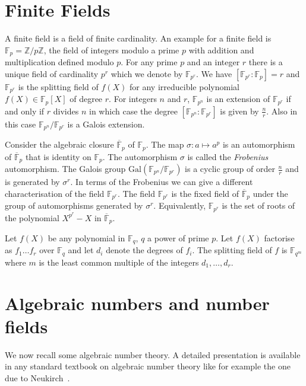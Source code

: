 \documentclass[11pt]{madras}%
\theoremstyle{remark}
\newcommand{\Gal}[1]{{\ensuremath{\mathrm{Gal}\left(#1\right)}}}
\begin{document}
\section{Finite Fields}\label{sect-finite-fields}

A finite field is a field of finite cardinality. An example for a
finite field is $\mathbb{F}_p = \mathbb{Z}/p\mathbb{Z}$, the field of
integers modulo a prime $p$ with addition and multiplication defined
modulo $p$.  For any prime $p$ and an integer $r$ there is a unique
field of cardinality $p^r$ which we denote by $\mathbb{F}_{p^r}$. We
have $[\mathbb{F}_{p^r} : \mathbb{F}_p] = r$ and $\mathbb{F}_{p^r}$ is
the splitting field of $f(X)$ for any irreducible polynomial $f(X) \in
\mathbb{F}_p[X]$ of degree $r$. For integers $n$ and $r$,
$\mathbb{F}_{p^n}$ is an extension of $\mathbb{F}_{p^r}$ if and only
if $r$ divides $n$ in which case the degree
$[\mathbb{F}_{p^n}:\mathbb{F}_{p^r}]$ is given by $\frac{n}{r}$. Also
in this case $\mathbb{F}_{p^n}/\mathbb{F}_{p^r}$ is a Galois
extension.

Consider the algebraic closure $\overline{\mathbb{F}}_p$ of
$\mathbb{F}_p$. The map $\sigma: a \mapsto a^p$ is an automorphism of
$\overline{\mathbb{F}}_p$ that is identity on $\mathbb{F}_p$. The
automorphism $\sigma$ is called the \emph{Frobenius}
automorphism. The Galois group
$\Gal{\mathbb{F}_{p^n}/\mathbb{F}_{p^r}}$ is a cyclic group of order
$\frac{n}{r}$ and is generated by $\sigma^r$.  In terms of the
Frobenius we can give a different characterisation of the field
$\mathbb{F}_{p^r}$. The field $\mathbb{F}_{p^r}$ is the fixed field of
$\overline{\mathbb{F}}_p$ under the group of automorphisms generated
by $\sigma^r$. Equivalently, $\mathbb{F}_{p^r}$ is the set of roots of
the polynomial $X^{p^r} - X$ in $\overline{\mathbb{F}}_p$.

Let $f(X)$ be any polynomial in $\mathbb{F}_q$, $q$ a power of prime
$p$. Let $f(X)$ factorise as $f_1\ldots f_r$ over $\mathbb{F}_q$ and
let $d_i$ denote the degrees of $f_i$. The splitting field of $f$ is
$\mathbb{F}_{q^m}$ where $m$ is the least common multiple of the
integers $d_1,\ldots,d_r$.

\section{Algebraic numbers and number fields}\label{sect-ant}

We now recall some algebraic number theory.  A detailed presentation
is available in any standard textbook on algebraic number theory like
for example the one due to Neukirch~\cite{neukirch:ant}.
\end{document}
